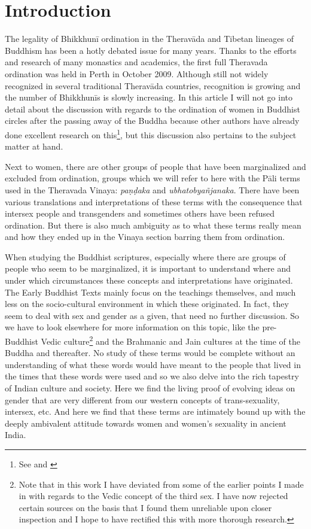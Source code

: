 \section{Introduction}
The legality of Bhikkhunī ordination in the Theravāda and Tibetan lineages of Buddhism has been a hotly debated issue for many years. Thanks to the efforts and research of many monastics and academics, the first full Theravada ordination was held in Perth in October 2009. Although still not widely recognized in several traditional Theravāda countries, recognition is growing and the number of Bhikkhunīs is slowly increasing. In this article I will not go into detail about the discussion with regards to the ordination of women in Buddhist circles after the passing away of the Buddha because other authors have already done excellent research on this\footnote{See \cite{sujato2009} and \cite{analayo2013}}, but this discussion also pertains to the subject matter at hand.

Next to women, there are other groups of people that have been marginalized and excluded from ordination, groups which we will refer to here with the Pāli terms used in the Theravada Vinaya: {\em paṇḍaka} and {\em ubhatob­yañ­janaka}. There have been various translations and interpretations of these terms with the consequence that intersex people and transgenders and sometimes others have been refused ordination. But there is also much ambiguity as to what these terms really mean and how they ended up in the Vinaya section barring them from ordination.

When studying the Buddhist scriptures, especially where there are groups of people who seem to be marginalized, it is important to understand where and under which circumstances these concepts and interpretations have originated. The Early Buddhist Texts mainly focus on the teachings themselves, and much less on the socio-cultural environment in which these originated. In fact, they seem to deal with sex and gender as a given, that need no further discussion. So we have to look elsewhere for more information on this topic, like the pre-Buddhist Vedic culture\footnote{Note that in this work I have deviated from some of the earlier points I made in \cite{vimala} with regards to the Vedic concept of the third sex. I have now rejected certain sources on the basis that I found them unreliable upon closer inspection and I hope to have rectified this with more thorough research.} and the Brahmanic and Jain cultures at the time of the Buddha and thereafter. No study of these terms would be complete without an understanding of what these words would have meant to the people that lived in the times that these words were used and so we also delve into the rich tapestry of Indian  culture and society. Here we find the living proof of evolving ideas on gender that are very different from our western concepts of trans-sexuality, intersex, etc. And here we find that these terms are intimately bound up with the deeply ambivalent attitude towards women and women's sexuality in ancient India.

